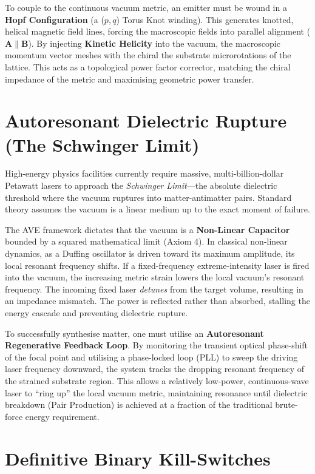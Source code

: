 To couple to the continuous vacuum metric, an emitter must be wound in a \textbf{Hopf Configuration} (a ($p,q$) Torus Knot winding). This generates knotted, helical magnetic field lines, forcing the macroscopic fields into parallel alignment ($\mathbf{A} \parallel \mathbf{B}$). By injecting \textbf{Kinetic Helicity} into the vacuum, the macroscopic momentum vector meshes with the chiral the substrate microrotations of the lattice. This acts as a topological power factor corrector, matching the chiral impedance of the metric and maximising geometric power transfer.

\section{Autoresonant Dielectric Rupture (The Schwinger Limit)}

High-energy physics facilities currently require massive, multi-billion-dollar Petawatt lasers to approach the \textit{Schwinger Limit}---the absolute dielectric threshold where the vacuum ruptures into matter-antimatter pairs. Standard theory assumes the vacuum is a linear medium up to the exact moment of failure.

The AVE framework dictates that the vacuum is a \textbf{Non-Linear Capacitor} bounded by a squared mathematical limit (Axiom 4). In classical non-linear dynamics, as a Duffing oscillator is driven toward its maximum amplitude, its local resonant frequency shifts. If a fixed-frequency extreme-intensity laser is fired into the vacuum, the increasing metric strain lowers the local vacuum's resonant frequency. The incoming fixed laser \textit{detunes} from the target volume, resulting in an impedance mismatch. The power is reflected rather than absorbed, stalling the energy cascade and preventing dielectric rupture.

To successfully synthesise matter, one must utilise an \textbf{Autoresonant Regenerative Feedback Loop}. By monitoring the transient optical phase-shift of the focal point and utilising a phase-locked loop (PLL) to sweep the driving laser frequency downward, the system tracks the dropping resonant frequency of the strained substrate region. This allows a relatively low-power, continuous-wave laser to ``ring up'' the local vacuum metric, maintaining resonance until dielectric breakdown (Pair Production) is achieved at a fraction of the traditional brute-force energy requirement.

\section{Definitive Binary Kill-Switches}

